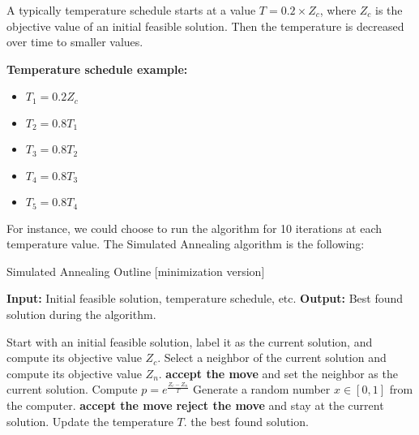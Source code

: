 A typically temperature schedule starts at a value $T = 0.2 \times Z_c$, where $Z_c$ is the objective value of an initial feasible solution.  Then the temperature is decreased over time to smaller values.

\textbf{Temperature schedule example:}
\begin{itemize}
\item  $T_1 = 0.2 Z_c$
\item $T_2 = 0.8 T_1$
\item $T_3 = 0.8 T_2$
\item $T_4 = 0.8 T_3$
\item $T_5 = 0.8 T_4$
\end{itemize}
For instance, we could choose to run the algorithm for 10 iterations at each temperature value.  The Simulated Annealing algorithm is the following:
\begin{algorithm}
\caption{Simulated Annealing Outline [minimization version]}
\begin{algorithmic}[1]
    \State \textbf{Input:} Initial feasible solution, temperature schedule, etc.
    \State \textbf{Output:} Best found solution during the algorithm.

    \State Start with an initial feasible solution, label it as the current solution, and compute its objective value $Z_c$.
        \State Select a neighbor of the current solution and compute its objective value $Z_n$.
            \State \textbf{accept the move} and set the neighbor as the current solution.
        \Else
            \State Compute $p = e^{\frac{Z_c - Z_n}{T}}$
            \State Generate a random number $x \in [0,1]$ from the computer.
                \State \textbf{accept the move}
            \Else
                \State \textbf{reject the move} and stay at the current solution.
            \EndIf
        \EndIf
        \State Update the temperature $T$.
    \EndWhile
    \State \Return the best found solution.
\end{algorithmic}
\end{algorithm}




